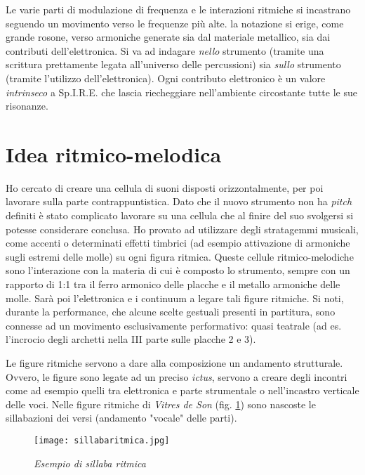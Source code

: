 Le varie parti di modulazione di frequenza e le interazioni ritmiche si incastrano seguendo un movimento verso le frequenze più alte. la notazione si erige, come grande rosone, verso armoniche generate sia dal materiale metallico, sia dai contributi dell'elettronica.  Si va ad indagare \textit{nello} strumento (tramite una scrittura prettamente legata all'universo delle percussioni) sia \textit{sullo} strumento (tramite l'utilizzo dell'elettronica). Ogni contributo elettronico è un valore \textit{intrinseco} a Sp.I.R.E. che lascia riecheggiare nell'ambiente circostante tutte le sue risonanze.


\section{Idea ritmico-melodica}

Ho cercato di creare una cellula di suoni disposti orizzontalmente, per poi lavorare sulla parte contrappuntistica. Dato che il nuovo strumento non ha \textit{pitch} definiti è stato complicato lavorare su una cellula che al finire del suo svolgersi si potesse considerare conclusa. Ho provato ad utilizzare degli stratagemmi musicali, come accenti o determinati effetti timbrici (ad esempio attivazione di armoniche sugli estremi delle molle) su ogni figura ritmica. Queste cellule ritmico-melodiche sono l'interazione con la materia di cui è composto lo strumento, sempre con un rapporto di 1:1 tra il ferro armonico delle placche e il metallo armoniche delle molle.
Sarà poi l'elettronica e i continuum a legare tali figure ritmiche. Si noti, durante la performance, che alcune scelte gestuali presenti in partitura, sono connesse ad un movimento esclusivamente performativo: quasi teatrale (ad es. l'incrocio degli archetti nella III parte sulle placche 2 e 3).

Le figure ritmiche servono a dare alla composizione un andamento strutturale. Ovvero, le figure sono legate ad un preciso \textit{ictus}, servono a creare degli incontri come ad esempio quelli tra elettronica e parte strumentale o nell'incastro verticale delle voci. Nelle figure ritmiche di \textit{Vitres de Son}  (fig. \ref{fig:sill}) sono nascoste le sillabazioni dei versi (andamento "vocale" delle parti).


\begin{figure}[htbp]
\begin{center}
\texttt{[image: sillabaritmica.jpg]}
\caption{\textit{Esempio di sillaba ritmica}}
\label{fig:sill}
\end{center}
\end{figure}

